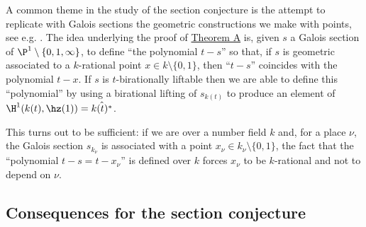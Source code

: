 A common theme in the study of the section conjecture is the attempt to replicate with Galois sections the geometric constructions we make with points, see e.g. \cite[Chapter 3]{sti13}. The idea underlying the proof of \hyperlink{TA}{Theorem A} is, given $s$ a Galois section of $\P^{1}\setminus\{0,1,\infty\}$, to define ``the polynomial $t-s$'' so that, if $s$ is geometric associated to a $k$-rational point $x \in k\setminus\{0,1\}$, then ``$t-s$'' coincides with the polynomial $t-x$. If $s$ is $t$-birationally liftable then we are able to define this ``polynomial'' by using a birational lifting of $s_{k(t)}$ to produce an element of $\H^{1}(k(t),\hz(1))=\hat{k(t)^{*}}$.


This turns out to be sufficient: if we are over a number field $k$ and, for a place $\nu$, the Galois section $s_{k_{\nu}}$ is associated with a point $x_{\nu}\in k_{\nu}\setminus\{0,1\}$, the fact that the ``polynomial $t-s=t-x_{\nu}$'' is defined over $k$ forces $x_{\nu}$ to be $k$-rational and not to depend on $\nu$.




\subsection{Consequences for the section conjecture}

